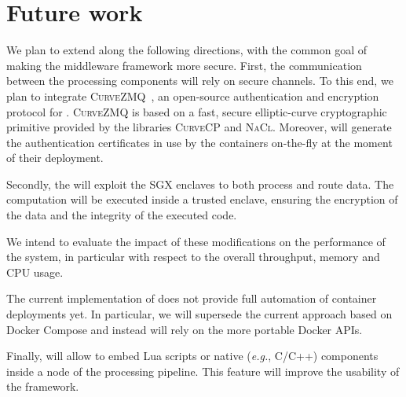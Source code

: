 \section{Future work}
\label{sec:future}
We plan to extend \SYS along the following directions, with the common goal of making the middleware framework more secure.
First, the communication between the processing components will rely on secure channels.
To this end, we plan to integrate \textsc{CurveZMQ}~\cite{zmq:curvezmq}, an open-source authentication and encryption protocol for \zmq.
\textsc{CurveZMQ} is based on a fast, secure elliptic-curve cryptographic primitive provided by the libraries \textsc{CurveCP} and \textsc{NaCl}.
Moreover, \SYS will generate the authentication certificates in use by the containers on-the-fly at the moment of their deployment.

Secondly, the \SYS will exploit the SGX enclaves to both process and route data.
The computation will be executed inside a trusted enclave, ensuring the encryption of the data and the integrity of the executed code.

We intend to evaluate the impact of these modifications on the performance of the system, in particular with respect to the overall throughput, memory and CPU usage.

The current implementation of \SYS does not provide full automation of container deployments yet.
In particular, we will supersede the current approach based on Docker Compose and instead will rely on the more portable Docker APIs.

Finally, \SYS will allow to embed Lua scripts or native (\emph{e.g.}, C/C++) components inside a node of the processing pipeline.
This feature will improve the usability of the framework.
